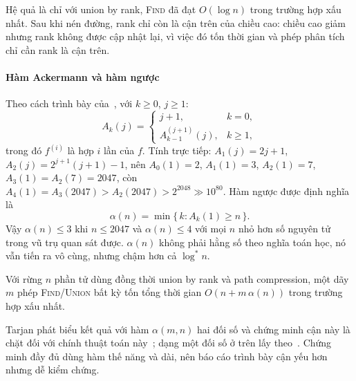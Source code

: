 Hệ quả là chỉ với union by rank, \textsc{Find} đã đạt $O(\log n)$ trong trường hợp xấu nhất. Sau khi nén đường, rank chỉ còn là cận trên của chiều cao: chiều cao giảm nhưng rank không được cập nhật lại, vì việc đó tốn thời gian và phép phân tích chỉ cần rank là cận trên.

\paragraph*{Hàm Ackermann và hàm ngược} Theo cách trình bày của~\cite{clrs2022}, với $k \ge 0$, $j \ge 1$:
\[
A_k(j) =
\begin{cases}
j + 1, & k = 0,\\
A_{k-1}^{(j+1)}(j), & k \ge 1,
\end{cases}
\]
trong đó $f^{(i)}$ là hợp $i$ lần của $f$. Tính trực tiếp: $A_1(j) = 2j+1$, $A_2(j) = 2^{j+1}(j+1) - 1$, nên $A_0(1)=2$, $A_1(1)=3$, $A_2(1)=7$, $A_3(1)=A_2(7)=2047$, còn $A_4(1)=A_3(2047) > A_2(2047) > 2^{2048} \gg 10^{80}$. Hàm ngược được định nghĩa là
\[
\alpha(n) = \min\{\,k : A_k(1) \ge n\,\}.
\]
Vậy $\alpha(n) \le 3$ khi $n \le 2047$ và $\alpha(n) \le 4$ với mọi $n$ nhỏ hơn số nguyên tử trong vũ trụ quan sát được. $\alpha(n)$ không phải hằng số theo nghĩa toán học, nó vẫn tiến ra vô cùng, nhưng chậm hơn cả $\log^* n$.

\begin{theorem}\label{thm:nw-tarjan}
Với rừng $n$ phần tử dùng đồng thời union by rank và path compression, một dãy $m$ phép \textsc{Find}/\textsc{Union} bất kỳ tốn tổng thời gian $O(n + m\,\alpha(n))$ trong trường hợp xấu nhất.
\end{theorem}

Tarjan phát biểu kết quả với hàm $\alpha(m,n)$ hai đối số và chứng minh cận này là chặt đối với chính thuật toán này~\cite{tarjan1975}; dạng một đối số ở trên lấy theo~\cite{clrs2022}. Chứng minh đầy đủ dùng hàm thế năng và dài, nên báo cáo trình bày cận yếu hơn nhưng dễ kiểm chứng.

